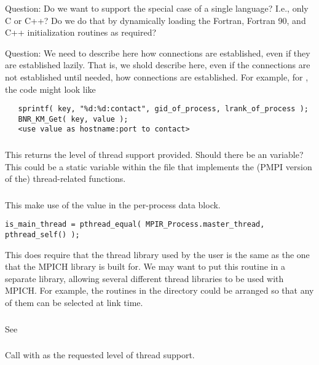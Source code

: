 \documentclass{article}
\begin{document}
Question: Do we want to support the special case of a single language?  I.e.,
only C or C++?  Do we do that by dynamically loading the Fortran, Fortran 90,
and C++ initialization routines as required?

Question:  We need to describe here how connections are established, even if
they are established lazily.  That is, we shold describe here, even if the
connections are not established until needed, how connections are
established.  For example, for \tcpname, the code might look like
\begin{verbatim}
   sprintf( key, "%d:%d:contact", gid_of_process, lrank_of_process );
   BNR_KM_Get( key, value );
   <use value as hostname:port to contact>
\end{verbatim}

\subsubsection{}
This returns the level of thread support provided.  Should there be an
 variable?  This could be a static
variable within the file that implements the (PMPI version of the)
thread-related functions. 

\subsubsection{}
This make use of the  value in the
per-process data block.

\begin{verbatim}
is_main_thread = pthread_equal( MPIR_Process.master_thread, pthread_self() );
\end{verbatim}
This does require that the thread library used by the user is the same as the
one that the MPICH library is built for.  We may want to put this routine in a
separate library, allowing several different thread libraries to be used with
MPICH.  For example, the routines in the  directory could be
arranged so that any of them can be selected at link time.

\subsubsection{}
See 

\subsubsection{}
Call  with  as the
requested level of thread support.
\end{document}
